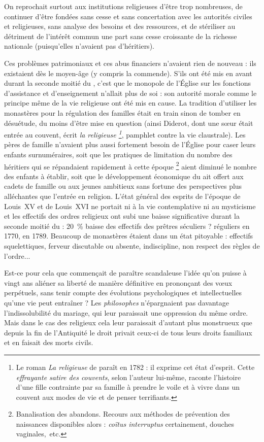  On reprochait surtout aux institutions religieuses d'être trop nombreuses, de continuer d'être fondées sans cesse et sans concertation avec les autorités civiles et religieuses, sans analyse des besoins et des ressources, et de stériliser au détriment de l'intérêt commun une part sans cesse croissante de la richesse nationale (puisqu'elles n'avaient pas d'héritiers). 

 Ces problèmes patrimoniaux et ces abus financiers n'avaient rien de nouveau : ils existaient dès le moyen-âge (y compris la commende). S'ils ont été mis en avant durant la seconde moitié du , c'est que le monopole de l'Église sur les fonctions d'assistance et d'enseignement n'allait plus de soi : son autorité morale comme le principe même de la vie religieuse ont été mis en cause. La tradition d'utiliser les monastères pour la régulation des familles était en train sinon de tomber en désuétude, du moins d'être mise en question (ainsi Diderot, dont une sœur était entrée au couvent, écrit \emph{la religieuse 
\footnote{Le roman \emph{La religieuse} de  paraît en 1782 : il exprime cet état d'esprit. Cette \emph{effrayante satire des couvents}, selon l'auteur lui-même, raconte l'histoire d'une fille contrainte par sa famille à prendre le voile et à vivre dans un couvent aux modes de vie et de penser terrifiants.}}, pamphlet contre la vie claustrale). Les pères de famille n'avaient plus aussi fortement besoin de l'Église pour caser leurs enfants surnuméraires, soit que les pratiques de limitation du nombre des héritiers qui se répandaient rapidement à cette époque 
\footnote{Banalisation des abandons. Recours aux méthodes de prévention des naissances disponibles alors : \emph{coïtus interruptus} certainement, douches vaginales,~etc.} 
aient diminué le nombre des enfants à établir, soit que le développement économique du  ait offert aux cadets de famille ou aux jeunes ambitieux sans fortune des perspectives plus alléchantes que l'entrée en religion. L'état général des esprits de l'époque de Louis~XV et de Louis~XVI ne portait ni à la vie contemplative ni au mysticisme et les effectifs des ordres religieux ont subi une baisse significative durant la seconde moitié du  : 20~\% baisse des effectifs des prêtres séculiers ?  réguliers en 1770,  en 1789. Beaucoup de monastères étaient dans un état pitoyable : effectifs squelettiques, ferveur discutable ou absente, indiscipline, non respect des règles de l'ordre... 

 Est-ce pour cela que commençait de paraître scandaleuse
l'idée qu'on puisse à vingt ans aliéner sa liberté de manière définitive en prononçant des vœux perpétuels, sans tenir compte des évolutions psychologiques et intellectuelles qu'une vie peut entraîner ? Les \emph{philosophes} n'épargnaient pas davantage l'indissolubilité du mariage, qui leur paraissait une oppression du même ordre. Mais dans le cas des religieux cela leur paraissait d'autant plus monstrueux que depuis la fin de l'Antiquité le droit privait ceux-ci de tous leurs droits familiaux et en faisait des morts civils. 

